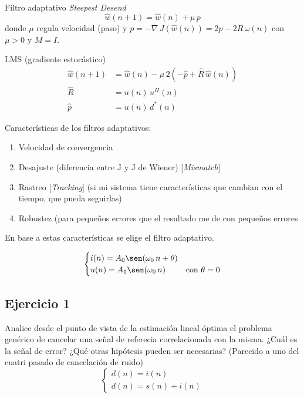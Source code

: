Filtro adaptativo
\emph{Steepest Desend}	
	\begin{equation*}
		\hat{w}(n+1) = \hat{w}(n) + \mu\,p
	\end{equation*}
	donde $\mu$ regula velocidad (paso) y $p = -\nabla\, J(\hat{w}(n)) = 2p - 2R\,\omega(n)$ con $\mu > 0$ y $M = I$.

LMS (gradiente estocástico)
	\begin{align*}
		\hat{w}(n+1) &= \hat{w}(n) - \mu\, 2(-\hat{p} + \hat{R}\,\hat{w}(n))\\
		\hat{R} &= u(n) \, u^{H}(n)\\
		\hat{p} &= u(n) \, d^{*}(n)
	\end{align*}

Características de los filtros adaptativos:
	\begin{enumerate}
		\item Velocidad de convergencia
		\item Desajuste (diferencia entre J y J de Wiener) [\emph{Mismatch}]
		\item Rastreo [\emph{Tracking}] (si mi sistema tiene características que cambian con el tiempo, que pueda seguirlas)
		\item Robustez (para pequeños errores que el resultado me de con pequeños errores
	\end{enumerate}

	En base a estas características se elige el filtro adaptativo.

	\begin{equation*}
		\begin{cases}
			i(n) = A_0 \sen (\omega_0 \, n + \theta)\\
			u(n) = A_1 \sen (\omega_0 \, n) & \text{con $\theta=0$}
		\end{cases}
	\end{equation*}

\subsection{Ejercicio 1}
	Analice desde el punto de vista de la estimación lineal óptima el problema genérico de cancelar una señal de referecia correlacionada con la misma. ¿Cuál es la señal de error? ¿Qué otras hipótesis pueden ser necesarias? (Parecido a uno del cuatri pasado de cancelación de ruido)
	\begin{equation*}
		\begin{cases}
			d(n) = i(n)\\
			d(n) = s(n) + i(n)
		\end{cases}
	\end{equation*}

